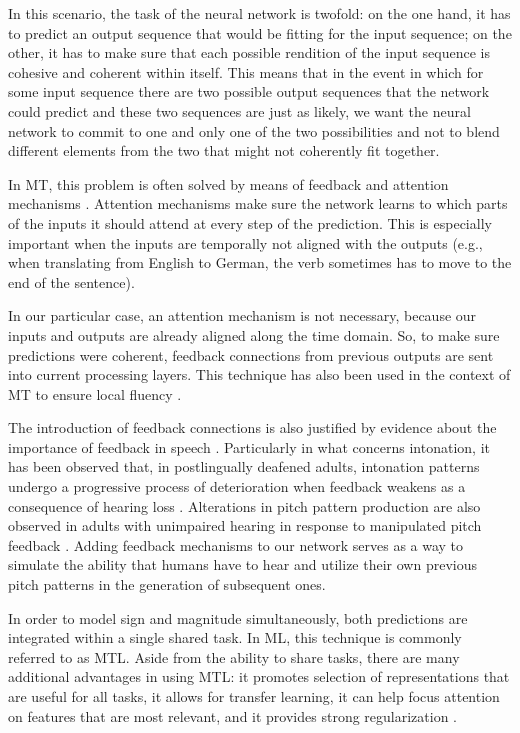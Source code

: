 In this scenario, the task of the neural network is twofold: on the one hand, it has to predict an output sequence that would be fitting for the input sequence; on the other, it has to make sure that each possible rendition of the input sequence is cohesive and coherent within itself.
This means that in the event in which for some input sequence there are two possible output sequences that the network could predict and these two sequences are just as likely, we want the neural network to commit to one and only one of the two possibilities and not to blend different elements from the two that might not coherently fit together.

In \ac{MT}, this problem is often solved by means of feedback and attention mechanisms \citep{Cho2014Learning, Luong2015Effective}. 
Attention mechanisms make sure the network learns to which parts of the inputs it should attend at every step of the prediction.
This is especially important when the inputs are temporally not aligned with the outputs (e.g., when translating from English to German, the verb sometimes has to move to the end of the sentence).

In our particular case, an attention mechanism is not necessary, because our inputs and outputs are already aligned along the time domain.
So, to make sure predictions were coherent, feedback connections from previous outputs are sent into current processing layers. 
This technique has also been used in the context of \ac{MT} to ensure local fluency \citep{Cho2014Learning}.

The introduction of feedback connections is also justified by evidence about the importance of feedback in speech \citep{Borden1980Use}.
Particularly in what concerns intonation, it has been observed that, in postlingually deafened adults, intonation patterns undergo a progressive process of deterioration when feedback weakens as a consequence of hearing loss \citep{Lane1991Speech}.
Alterations in pitch pattern production are also observed in adults with unimpaired hearing in response to manipulated pitch feedback \citep{Burnett1998Voice}.
Adding feedback mechanisms to our network serves as a way to simulate the ability that humans have to hear and utilize their own previous pitch patterns in the generation of subsequent ones.

In order to model sign and magnitude simultaneously, both predictions are integrated within a single shared task.
In \ac{ML}, this technique is commonly referred to as \ac{MTL}.
Aside from the ability to share tasks, there are many additional advantages in using \ac{MTL}: it promotes selection of representations that are useful for all tasks, it allows for transfer learning, it can help focus attention on features that are most relevant, and it provides strong regularization \citep{Ruder2017overview}.

